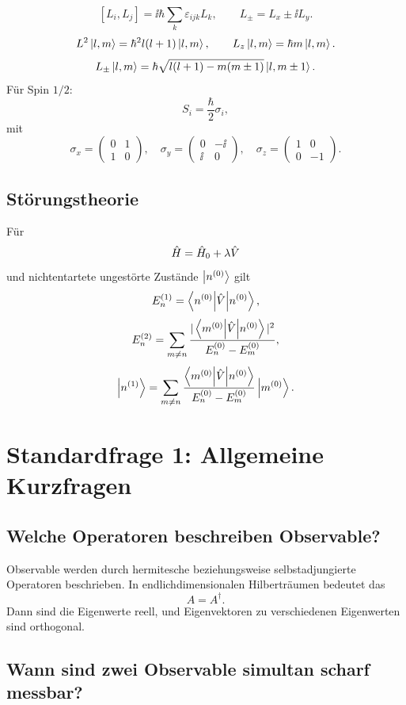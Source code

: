\[
    [L_i,L_j]=\ii\hbar\sum_k\varepsilon_{ijk}L_k,
    \qquad
    L_\pm=L_x\pm\ii L_y.
\]
\[
    L^2\left|l,m\right\rangle=\hbar^2l(l+1)\left|l,m\right\rangle,
    \qquad
    L_z\left|l,m\right\rangle=\hbar m\left|l,m\right\rangle.
\]
\[
    L_\pm\left|l,m\right\rangle=\hbar\sqrt{l(l+1)-m(m\pm1)}\left|l,m\pm1\right\rangle.
\]
Für Spin $1/2$:
\[
    S_i=\frac{\hbar}{2}\sigma_i,
\]
mit
\[
    \sigma_x=\begin{pmatrix}0&1\\1&0\end{pmatrix},
    \quad
    \sigma_y=\begin{pmatrix}0&-\ii\\\ii&0\end{pmatrix},
    \quad
    \sigma_z=\begin{pmatrix}1&0\\0&-1\end{pmatrix}.
\]

\subsection{Störungstheorie}

Für
\[
    \hat H=\hat H_0+\lambda\hat V
\]
und nichtentartete ungestörte Zustände $\left|n^{(0)}\right\rangle$ gilt
\[
    E_n^{(1)}=\left\langle n^{(0)}\middle|\hat V\middle|n^{(0)}\right\rangle,
\]
\[
    E_n^{(2)}=\sum_{m\neq n}\frac{|\left\langle m^{(0)}\middle|\hat V\middle|n^{(0)}\right\rangle|^2}{E_n^{(0)}-E_m^{(0)}},
\]
\[
    \left|n^{(1)}\right\rangle=\sum_{m\neq n}\frac{\left\langle m^{(0)}\middle|\hat V\middle|n^{(0)}\right\rangle}{E_n^{(0)}-E_m^{(0)}}\left|m^{(0)}\right\rangle.
\]

\section{Standardfrage 1: Allgemeine Kurzfragen}

\subsection{Welche Operatoren beschreiben Observable?}

\begin{answerbox}
Observable werden durch hermitesche beziehungsweise selbstadjungierte Operatoren beschrieben. In endlichdimensionalen Hilberträumen bedeutet das
\[
    A=A^\dagger.
\]
Dann sind die Eigenwerte reell, und Eigenvektoren zu verschiedenen Eigenwerten sind orthogonal.
\end{answerbox}

\subsection{Wann sind zwei Observable simultan scharf messbar?}

